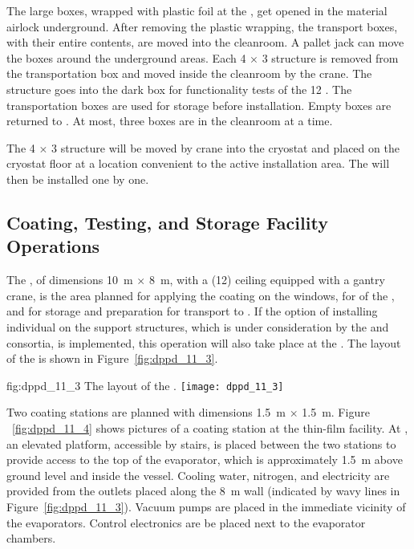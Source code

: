 The large  boxes, wrapped with plastic foil at the , get opened in the material airlock underground. After removing the plastic wrapping, the transport boxes, with their entire contents, are moved into the cleanroom. A pallet jack can move the   boxes around the underground areas. Each \num{4} $\times$ \num{3} structure is removed from the transportation box and moved inside the cleanroom by the crane. The structure goes into the dark box for functionality tests of the \num{12} . The transportation boxes are used for storage before installation. Empty boxes are returned to . At most, three  boxes are in the cleanroom at a time.

The \num{4} $\times$ \num{3} structure will be moved by crane into the cryostat and placed on the cryostat floor at a location convenient to the active installation area. The  will then be installed one by one. 

\subsection{Coating, Testing, and Storage Facility Operations}
\label{subsec:dp-pds-itf}

The , of dimensions \SI{10}{\m} $\times$ \SI{8}{\m}, with a (\SI{12}{\ft}) ceiling equipped with a gantry crane, is the area planned for applying the  coating on the  windows, for  of the , and for storage and preparation for transport to . If the option of installing individual  on the  support structures, which is under consideration by the \dual {} and  consortia, is %
implemented, this operation will also take place at the . The layout of the  is shown in Figure~\ref{fig:dppd_11_3}.

\begin{dunefigure}{fig:dppd_11_3}
{The layout of the .}
\texttt{[image: dppd\_11\_3]}
\end{dunefigure}

Two coating stations are planned with dimensions \SI{1.5}{\m} $\times$ \SI{1.5}{\m}. Figure ~\ref{fig:dppd_11_4} shows pictures of a  coating station at the  thin-film facility. At , an elevated platform, accessible by stairs, is placed between the two stations %
to provide access to the top of the evaporator, which is approximately \SI{1.5}{\m} above ground level and inside the vessel. Cooling water, nitrogen, and electricity are provided from the outlets placed along the \SI{8}{\m} wall (indicated by wavy lines in Figure~\ref{fig:dppd_11_3}). Vacuum pumps are placed in the immediate vicinity of the evaporators. Control electronics are be placed next to the evaporator chambers. 

